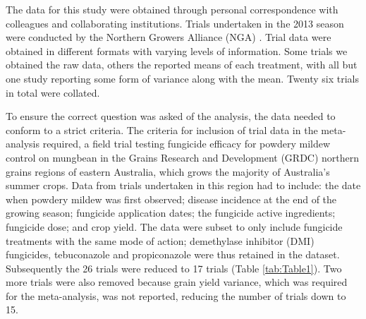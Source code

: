 \documentclass[agronomy,article,submit,moreauthors,pdftex]{mdpi}
\begin{document}
The data for this study were obtained through personal correspondence with colleagues and collaborating institutions.
Trials undertaken in the 2013 season were conducted by the Northern Growers Alliance (NGA) \citetext{\citeyear{goolhi2013}; \citeyear{premer2013}; \citeyear{Millmerran2013}; \citeyear{Marysmount2013}}.
Trial data were obtained in different formats with varying levels of information.
Some trials we obtained the raw data, others the reported means of each treatment, with all but one study reporting some form of variance along with the mean.
Twenty six trials in total were collated.

To ensure the correct question was asked of the analysis, the data needed to conform to a strict criteria.
The criteria for inclusion of trial data in the meta-analysis required, a field trial testing fungicide efficacy for powdery mildew control on mungbean in the Grains Research and Development (GRDC) northern grains regions of eastern Australia, which grows the majority of Australia's summer crops.
Data from trials undertaken in this region had to include: the date when powdery mildew was first observed; disease incidence at the end of the growing season; fungicide application dates; the fungicide active ingredients; fungicide dose; and crop yield.
The data were subset to only include fungicide treatments with the same mode of action; demethylase inhibitor (DMI) fungicides, tebuconazole and propiconazole were thus retained in the dataset.
Subsequently the 26 trials were reduced to 17 trials (Table \ref{tab:Table1}).
Two more trials were also removed because grain yield variance, which was required for the meta-analysis, was not reported, reducing the number of trials down to 15.
\end{document}
